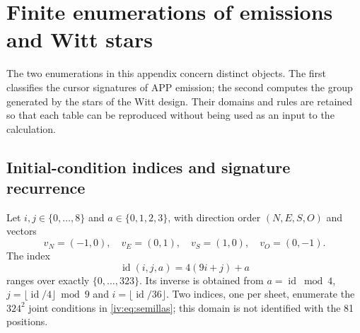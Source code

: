 \section{Finite enumerations of emissions and Witt stars}
\label{iv:iv:apendice-enumeraciones}

The two enumerations in this appendix concern distinct objects.
The first classifies the cursor signatures of APP emission;
the second computes the group generated by the stars of the Witt design.
Their domains and rules are retained so that each table can be reproduced
without being used as an input to the calculation.

\subsection{Initial-condition indices and signature recurrence}
\label{iv:iv:apendice-firmas}

Let \(i,j\in\{0,\ldots,8\}\) and \(a\in\{0,1,2,3\}\), with
direction order \((N,E,S,O)\) and vectors
\[
 v_N=(-1,0),\quad v_E=(0,1),\quad
 v_S=(1,0),\quad v_O=(0,-1).
\]
The index
\[
 \operatorname{id}(i,j,a)=4(9i+j)+a
\]
ranges over exactly \(\{0,\ldots,323\}\). Its inverse is obtained
from \(a=\operatorname{id}\bmod4\),
\(j=\lfloor\operatorname{id}/4\rfloor\bmod9\) and
\(i=\lfloor\operatorname{id}/36\rfloor\).
Two indices, one per sheet, enumerate the \(324^2\) joint conditions
in \eqref{iv:eq:semillas}; this domain is not identified with the 81 positions.

